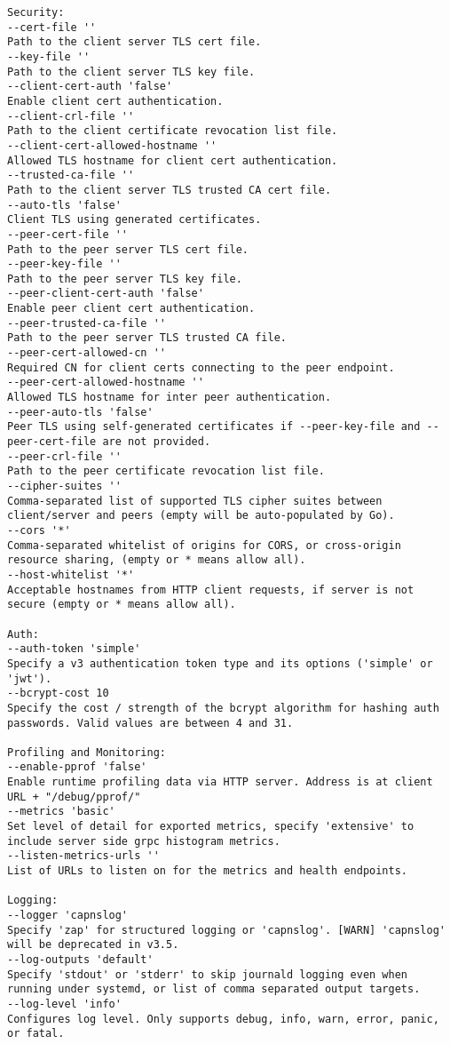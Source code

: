 \begin{verbatim}
Security:
--cert-file ''
Path to the client server TLS cert file.
--key-file ''
Path to the client server TLS key file.
--client-cert-auth 'false'
Enable client cert authentication.
--client-crl-file ''
Path to the client certificate revocation list file.
--client-cert-allowed-hostname ''
Allowed TLS hostname for client cert authentication.
--trusted-ca-file ''
Path to the client server TLS trusted CA cert file.
--auto-tls 'false'
Client TLS using generated certificates.
--peer-cert-file ''
Path to the peer server TLS cert file.
--peer-key-file ''
Path to the peer server TLS key file.
--peer-client-cert-auth 'false'
Enable peer client cert authentication.
--peer-trusted-ca-file ''
Path to the peer server TLS trusted CA file.
--peer-cert-allowed-cn ''
Required CN for client certs connecting to the peer endpoint.
--peer-cert-allowed-hostname ''
Allowed TLS hostname for inter peer authentication.
--peer-auto-tls 'false'
Peer TLS using self-generated certificates if --peer-key-file and --peer-cert-file are not provided.
--peer-crl-file ''
Path to the peer certificate revocation list file.
--cipher-suites ''
Comma-separated list of supported TLS cipher suites between client/server and peers (empty will be auto-populated by Go).
--cors '*'
Comma-separated whitelist of origins for CORS, or cross-origin resource sharing, (empty or * means allow all).
--host-whitelist '*'
Acceptable hostnames from HTTP client requests, if server is not secure (empty or * means allow all).

Auth:
--auth-token 'simple'
Specify a v3 authentication token type and its options ('simple' or 'jwt').
--bcrypt-cost 10
Specify the cost / strength of the bcrypt algorithm for hashing auth passwords. Valid values are between 4 and 31.

Profiling and Monitoring:
--enable-pprof 'false'
Enable runtime profiling data via HTTP server. Address is at client URL + "/debug/pprof/"
--metrics 'basic'
Set level of detail for exported metrics, specify 'extensive' to include server side grpc histogram metrics.
--listen-metrics-urls ''
List of URLs to listen on for the metrics and health endpoints.

Logging:
--logger 'capnslog'
Specify 'zap' for structured logging or 'capnslog'. [WARN] 'capnslog' will be deprecated in v3.5.
--log-outputs 'default'
Specify 'stdout' or 'stderr' to skip journald logging even when running under systemd, or list of comma separated output targets.
--log-level 'info'
Configures log level. Only supports debug, info, warn, error, panic, or fatal.


\end{verbatim}
